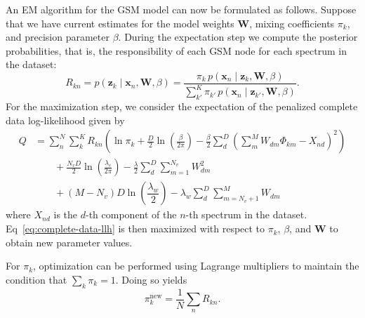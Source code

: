 An EM algorithm for the GSM model can now be formulated as follows. Suppose that
we have current estimates for the model weights $\mathbf{W}$, mixing
coefficients $\pi_k$, and precision parameter $\beta$. During the expectation
step we compute the posterior probabilities, that is, the responsibility of each
GSM node for each spectrum in the dataset:
\begin{equation}\label{eq:responsibility}
    R_{kn}  = p(\mathbf{z}_k \mid \mathbf{x}_n, \mathbf{W}, \beta) = \dfrac{\pi_k \, p(\mathbf{x}_n \mid \mathbf{z}_k, \mathbf{W}, \beta)}{\sum\limits_{k'}^K \pi_{k'} \, p(\mathbf{x}_n \mid \mathbf{z}_{k'}, \mathbf{W}, \beta)}.
\end{equation}
For the maximization step, we consider the expectation of the penalized
complete data log-likelihood given by
\begin{equation}\label{eq:complete-data-llh}
\begin{aligned}
    Q &= \sum_n^N\sum_k^K R_{kn} \left(\ln\pi_k + \frac{D}{2}\ln\left(\frac{\beta}{2\pi}\right) - \frac{\beta}{2}\sum_d^D\left(\sum_m^M W_{dm}\Phi_{km} - X_{nd}\right)^2\right) \\
    &\qquad + \frac{N_vD}{2}\ln\left(\frac{\lambda_e}{2\pi}\right) - \frac{\lambda}{2}\sum_d^D \sum_{m=1}^{N_v} W_{dm}^2  \\
    &\qquad + (M-N_v)D\ln\left(\dfrac{\lambda_w}{2}\right) - \lambda_w\sum_d^D\sum_{m=N_v+1}^{M} W_{dm}
\end{aligned}
\end{equation}
where $X_{nd}$ is the $d$-th component of the $n$-th spectrum in the dataset.
Eq~\ref{eq:complete-data-llh} is then maximized with respect to $\pi_k$,
$\beta$, and $\mathbf{W}$ to obtain new parameter values.

For $\pi_k$, optimization can be performed using Lagrange multipliers to
maintain the condition that $\sum_k\pi_k=1$. Doing so yields
\begin{equation}\label{eq:pi-update}
    \pi_k^{\text{new}}  = \frac{1}{N}\sum_n R_{kn}.
\end{equation}

